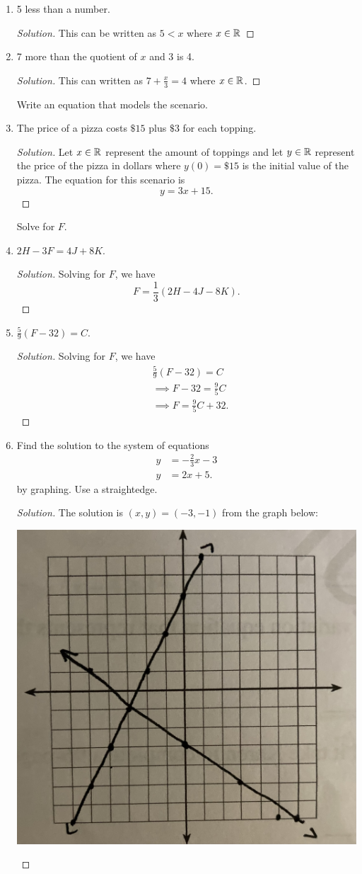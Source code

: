 \documentclass{article}
\begin{document}
\begin{enumerate}
\item 5 less than a number. 
    \begin{proof}[Solution]
    This can be written as \( 5 < x \) where \( x \in \mathbb{R} \)
    \end{proof}
\item 7 more than the quotient of \( x \) and 3 is 4.
    \begin{proof}[Solution]
    This can written as \( 7 + \frac{x}{3} = 4\) where \( x \in \mathbb{R} \).
    \end{proof}
Write an equation that models the scenario.
\item The price of a pizza costs \( \$ 15\) plus \( \$ 3 \) for each topping.
    \begin{proof}[Solution]
    Let \( x \in \mathbb{R} \) represent the amount of toppings and let \( y \in \mathbb{R} \) represent the price of the pizza in dollars where \( y(0) = \$ 15 \) is the initial value of the pizza. The equation for this scenario is 
    \[ y = 3x + 15. \]
    \end{proof}
Solve for \(F\).
\item \( 2H - 3F = 4J + 8K \).
    \begin{proof}[Solution]
    Solving for \(F \), we have 
    \[ F = \frac{1}{3}(2H - 4J - 8K ).\]
    \end{proof}
\item \( \frac{5}{9}(F - 32) = C \). 
    \begin{proof}[Solution]
        Solving for \( F \), we have
    \begin{align*}
        &\frac{5}{9}(F-32)= C   \\
        &\implies F - 32 = \frac{9}{5}C \\
        &\implies F = \frac{9}{5}C + 32.
    \end{align*}
    \end{proof}
\item Find the solution to the system of equations 
    \begin{align}
        y&= -\frac{2}{3}x - 3  \\
       y &= 2x + 5.
    \end{align}
    by graphing. Use a straightedge. 
    \begin{proof}[Solution]
    The solution is \( (x,y) = (-3,-1)\) from the graph below:
    \begin{center}
        \includegraphics[width = 0.5 \textwidth]{IMG_8426}

\end{center}
\end{proof}
\end{enumerate}
\end{document}
